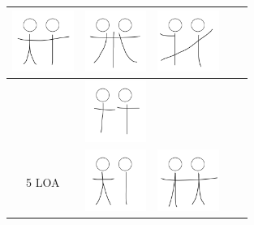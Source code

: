 \begin{table}[!htb]
\begin{tabular}{ | c | c || c | c | c | }
\begin{minipage}{.15\textwidth}
      \includegraphics[width=\linewidth, height=20mm]{img/07keyframe}
    \end{minipage}
    &
    \begin{minipage}{.15\textwidth}
      \includegraphics[width=\linewidth, height=20mm]{img/08keyframe}
    \end{minipage} 
    & 
    \begin{minipage}{.15\textwidth}
      \includegraphics[width=\linewidth, height=20mm]{img/09keyframe}
    \end{minipage} 
    \\ \hline 
    &
    \begin{minipage}{.15\textwidth}
      \includegraphics[width=\linewidth, height=20mm]{img/4-1loa_separate_keyframe}
    \end{minipage}
    & & & 
    \\ \hline
    5 LOA 
    &
    \begin{minipage}{.15\textwidth}
      \includegraphics[width=\linewidth, height=20mm]{img/5loa_separate_keyframe}
    \end{minipage}
    &
    \begin{minipage}{.15\textwidth}
      \includegraphics[width=\linewidth, height=20mm]{img/10keyframe}

\end{minipage}
\end{tabular}
\end{table}
